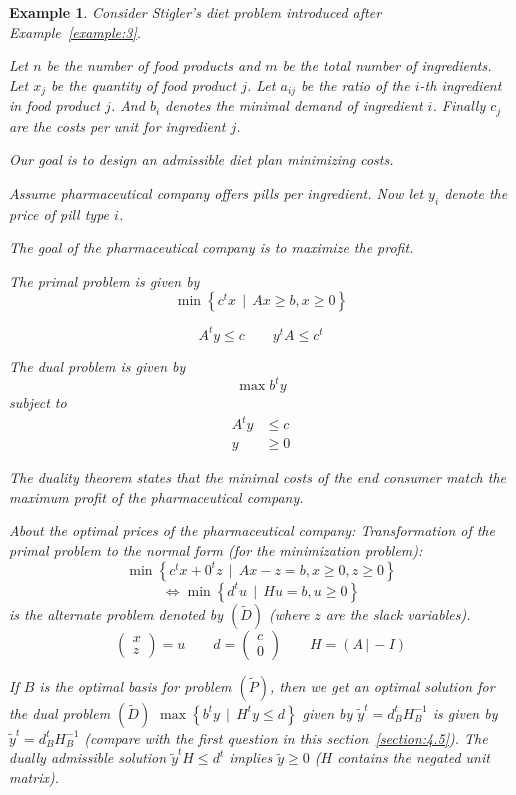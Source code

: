 \documentclass[a4paper]{article}
\numberwithin{lecref}{subsection}
\newcounter{exercises}
\newtheorem{example}[exercises]{Example}
\newcommand{\SetDef}[2]{\left\{#1\,\mid\,#2\right\}}
\begin{document}
\begin{example}
	Consider Stigler's diet problem introduced after Example~\ref{example:3}.

	Let $n$ be the number of food products and $m$ be the total number of ingredients.
	Let $x_j$ be the quantity of food product $j$.
	Let $a_{ij}$ be the ratio of the $i$-th ingredient in food product $j$.
	And $b_i$ denotes the minimal demand of ingredient $i$.
	Finally $c_j$ are the costs per unit for ingredient $j$.

	Our goal is to design an admissible diet plan minimizing costs.

	Assume pharmaceutical company offers pills per ingredient.
	Now let $y_i$ denote the price of pill type $i$.

	The goal of the pharmaceutical company is to maximize the profit.

	The primal problem is given by
	\[ \min\SetDef{c^t x}{Ax \geq b, x \geq 0} \]

	\[ A^t y \leq c \qquad y^t A \leq c^t \]

	The dual problem is given by
	\[ \max b^t y \]
	subject to
	\begin{align*}
		A^t y &\leq c \\
		y &\geq 0
	\end{align*}

	The duality theorem states that the minimal costs of the end consumer match the maximum profit of the pharmaceutical company.

	About the optimal prices of the pharmaceutical company:
	Transformation of the primal problem to the normal form (for the minimization problem):
	\[ \min\SetDef{c^tx + 0^t z}{Ax - z = b, x \geq 0, z \geq 0} \]
	\[ \iff \min\SetDef{d^t u}{Hu = b, u \geq 0} \]
	is the alternate problem denoted by $(\tilde D)$ (where $z$ are the slack variables).
	\[ \begin{pmatrix} x \\ z \end{pmatrix} = u \qquad d = \begin{pmatrix} c \\ 0 \end{pmatrix} \qquad H = (A \,|\, -I) \]

	If $B$ is the optimal basis for problem $(\tilde P)$, then we get an optimal solution for the dual problem $(\tilde D)$ $\max\SetDef{b^ty}{H^t y \leq d}$ given by $\tilde y^t = d_B^t H_B^{-1}$ is given by $\tilde y^t = d_B^t H_B^{-1}$ (compare with the first question in this section~\ref{section:4.5}). The dually admissible solution $\tilde y^t H \leq d^t$ implies $\tilde y \geq 0$ ($H$ contains the negated unit matrix).


\end{example}
\end{document}
